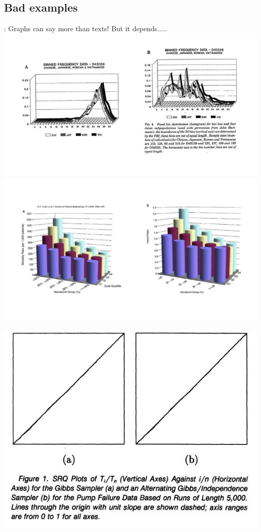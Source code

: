 \subsection{Bad examples}
\begin{frame}[allowframebreaks]{\secname: \subsecname}
	Graphs can say more than texts! But it depends.....
	\includegraphics[scale=0.3]{images/Example2}
	\framebreak
	\includegraphics[scale=0.3]{images/Example1}
	\framebreak
	\begin{center}
			\includegraphics[scale=0.5]{images/Example3}

\end{center}
\end{frame}
